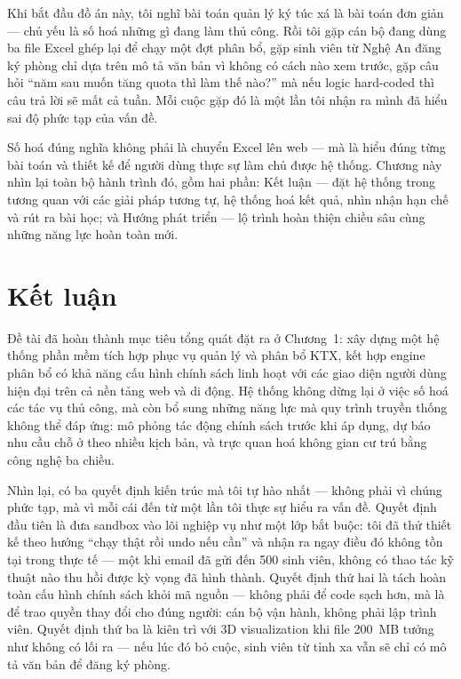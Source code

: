 \documentclass[../DoAn.tex]{subfiles}
\begin{document}
\sloppy

Khi bắt đầu đồ án này, tôi nghĩ bài toán quản lý ký túc xá là bài toán đơn
giản --- chủ yếu là số hoá những gì đang làm thủ công. Rồi tôi gặp cán bộ
đang dùng ba file Excel ghép lại để chạy một đợt phân bổ, gặp sinh viên từ
Nghệ An đăng ký phòng chỉ dựa trên mô tả văn bản vì không có cách nào xem
trước, gặp câu hỏi ``năm sau muốn tăng quota thì làm thế nào?'' mà nếu logic
hard-coded thì câu trả lời sẽ mất cả tuần. Mỗi cuộc gặp đó là một lần tôi
nhận ra mình đã hiểu sai độ phức tạp của vấn đề.

Số hoá đúng nghĩa không phải là chuyển Excel lên web --- mà là hiểu đúng từng
bài toán và thiết kế để người dùng thực sự làm chủ được hệ thống. Chương này
nhìn lại toàn bộ hành trình đó, gồm hai phần: Kết luận --- đặt hệ thống trong
tương quan với các giải pháp tương tự, hệ thống hoá kết quả, nhìn nhận hạn chế
và rút ra bài học; và Hướng phát triển --- lộ trình hoàn thiện chiều sâu cùng
những năng lực hoàn toàn mới.

\section{Kết luận}
\label{section:6.1}

Đề tài đã hoàn thành mục tiêu tổng quát đặt ra ở Chương~1: xây dựng một hệ
thống phần mềm tích hợp phục vụ quản lý và phân bổ KTX, kết hợp engine phân
bổ có khả năng cấu hình chính sách linh hoạt với các giao diện người dùng hiện
đại trên cả nền tảng web và di động. Hệ thống không dừng lại ở việc số hoá các
tác vụ thủ công, mà còn bổ sung những năng lực mà quy trình truyền thống không
thể đáp ứng: mô phỏng tác động chính sách trước khi áp dụng, dự báo nhu cầu
chỗ ở theo nhiều kịch bản, và trực quan hoá không gian cư trú bằng công nghệ ba
chiều.

Nhìn lại, có ba quyết định kiến trúc mà tôi tự hào nhất --- không phải vì chúng
phức tạp, mà vì mỗi cái đến từ một lần tôi thực sự hiểu ra vấn đề. Quyết định
đầu tiên là đưa sandbox vào lõi nghiệp vụ như một lớp bắt buộc: tôi đã thử
thiết kế theo hướng ``chạy thật rồi undo nếu cần'' và nhận ra ngay điều đó không
tồn tại trong thực tế --- một khi email đã gửi đến 500 sinh viên, không có thao
tác kỹ thuật nào thu hồi được kỳ vọng đã hình thành. Quyết định thứ hai là
tách hoàn toàn cấu hình chính sách khỏi mã nguồn --- không phải để code sạch
hơn, mà là để trao quyền thay đổi cho đúng người: cán bộ vận hành, không phải
lập trình viên. Quyết định thứ ba là kiên trì với 3D visualization khi file
200~MB tưởng như không có lối ra --- nếu lúc đó bỏ cuộc, sinh viên từ tỉnh xa
vẫn sẽ chỉ có mô tả văn bản để đăng ký phòng.
\end{document}
